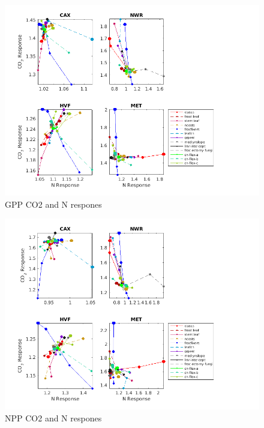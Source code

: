 \documentclass[draft,linenumbers]{agujournal}
\begin{document}
      
 \begin{figure}[h]
     \centering
     \includegraphics[width=1.55\textwidth, left]{matlab/figures/NOVc_CNdep_GPP1__p2012.png}
     \caption{GPP CO2 and N respones}
     \label{GPP CO2 and N respones 2001}
  \end{figure}
  
 \begin{figure}[h]
     \centering
     \includegraphics[width=1.55\textwidth, left]{matlab/figures/NOVc_CNdep_NPP1__p2012.png}
     \caption{NPP CO2 and N respones}
     \label{NPP CO2 and N respones 2001}
  \end{figure}
      
\end{document}
